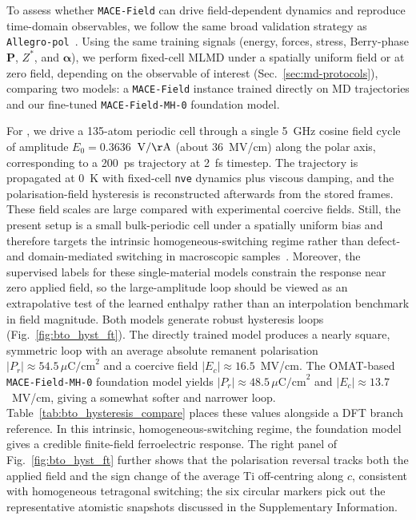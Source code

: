 \documentclass[aps,physrev,graphicx,amsmath,amssymb,
               reprint,superscriptaddress]{revtex4-2}
\begin{document}
To assess whether \texttt{MACE-Field} can drive field-dependent dynamics and reproduce time-domain observables, we follow the same broad validation strategy as \texttt{Allegro-pol}~\cite{allegro-pol-2025}. Using the same training signals (energy, forces, stress, Berry-phase $\mathbf{P}$, $Z^*$, and $\boldsymbol{\alpha}$), we perform fixed-cell MLMD under a spatially uniform field or at zero field, depending on the observable of interest (Sec.~\ref{sec:md-protocols}), comparing two models: a \texttt{MACE-Field} instance trained directly on MD trajectories and our fine-tuned \texttt{MACE-Field-MH-0} foundation model.

For , we drive a 135-atom periodic cell through a single 5~GHz cosine field cycle of amplitude $E_0 = 0.3636$~$\mathrm{V/\AA}$ (about $36$~\si{MV/cm}) along the polar axis, corresponding to a 200~ps trajectory at 2~fs timestep. The trajectory is propagated at 0~\si{K} with fixed-cell \texttt{nve} dynamics plus viscous damping, and the polarisation-field hysteresis is reconstructed afterwards from the stored frames. These field scales are large compared with experimental coercive fields. Still, the present setup is a small bulk-periodic cell under a spatially uniform bias and therefore targets the intrinsic homogeneous-switching regime rather than defect- and domain-mediated switching in macroscopic samples~\cite{dawber-2005-physics}. Moreover, the supervised labels for these single-material models constrain the response near zero applied field, so the large-amplitude loop should be viewed as an extrapolative test of the learned enthalpy rather than an interpolation benchmark in field magnitude. Both models generate robust hysteresis loops (Fig.~\ref{fig:bto_hyst_ft}). The directly trained model produces a nearly square, symmetric loop with an average absolute remanent polarisation $|P_r| \approx 54.5\,\mu\mathrm{C/cm}^2$ and a coercive field $|E_c| \approx 16.5$~\si{MV/cm}. The OMAT-based \texttt{MACE-Field-MH-0} foundation model yields $|P_r| \approx 48.5\,\mu\mathrm{C/cm}^2$ and $|E_c| \approx 13.7$~\si{MV/cm}, giving a somewhat softer and narrower loop. Table~\ref{tab:bto_hysteresis_compare} places these values alongside a DFT branch reference. In this intrinsic, homogeneous-switching regime, the foundation model gives a credible finite-field ferroelectric response. The right panel of Fig.~\ref{fig:bto_hyst_ft} further shows that the polarisation reversal tracks both the applied field and the sign change of the average Ti off-centring along $c$, consistent with homogeneous tetragonal switching; the six circular markers pick out the representative atomistic snapshots discussed in the Supplementary Information.
\end{document}
